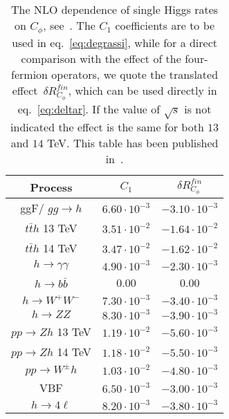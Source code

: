 
\begin{table}[h]
\centering
\begin{tabular}{ccc}
\toprule
Process&$C_1$ & $\delta R_{C_\phi}^{fin}$ \\
\midrule
ggF/ $gg\to h$  & $6.60\cdot 10^{-3}$ &  $-3.10\cdot 10^{-3}$ \\
$t\bar{t}h$   \textcolor{Mahogany}{13 TeV} & $3.51\cdot 10^{-2}$  &  $-1.64\cdot 10^{-2}$  \\
$t\bar{t}h$   \textcolor{Mahogany}{14 TeV} & $3.47\cdot 10^{-2}$  &  $-1.62\cdot 10^{-2}$ \\
$h\to \gamma \gamma$   & $4.90\cdot 10^{-3}$ &  $-2.30\cdot 10^{-3}$ \\
$h\to b\bar{b}$ & 0.00&0.00  \\
$h\to W^+ W^-$  & $7.30\cdot 10^{-3}$  & $-3.40\cdot 10^{-3}$ \\
$h\to Z Z$      & $8.30\cdot 10^{-3}$&  $-3.90\cdot 10^{-3}$ \\
$pp\to Zh$   \textcolor{Mahogany}{13 TeV}    & $1.19\cdot 10^{-2}$& $-5.60\cdot 10^{-3}$ \\
$pp\to Zh$    \textcolor{Mahogany}{14 TeV}    &$1.18\cdot 10^{-2}$&  $-5.50\cdot 10^{-3}$ \\
$pp\to W^\pm h$  & $1.03\cdot 10^{-2}$ &    $-4.80\cdot 10^{-3}$\\
VBF              & $6.50\cdot 10^{-3}$&   $-3.00\cdot 10^{-3}$ \\
$ h \to 4 \ell$       &     $8.20\cdot 10^{-3}$  &   $-3.80\cdot 10^{-3}$ \\
\bottomrule
\end{tabular}
\caption{The NLO dependence of single Higgs rates on $C_\phi$, see~\cite{Degrassi:2016wml}. The $C_1$ coefficients are to be used in eq.~\eqref{eq:degrassi}, while for a direct  comparison with the effect of the four-fermion operators, we quote the translated effect~$\delta R_{C_\phi}^{fin}$, which can be used directly in eq.~\eqref{eq:deltar}. If the value of $\sqrt{s}$ is not indicated the effect is the same for both $13$ and $14$ TeV. This table has been published in~\cite{Alasfar:2022zyr}.
}
\label{table:resch}
\end{table}
